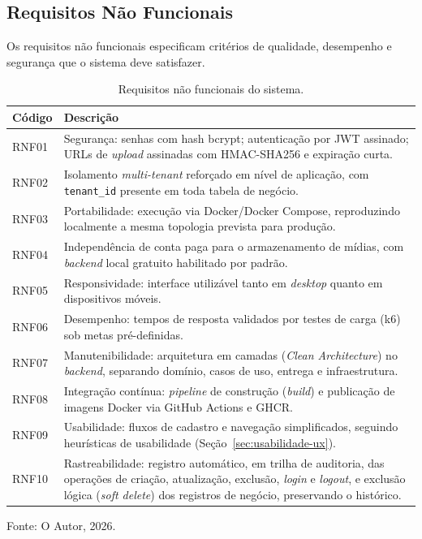 \subsection{Requisitos Não Funcionais}
\label{sec:requisitos-nao-funcionais}

Os requisitos não funcionais especificam critérios de qualidade, desempenho e segurança que o sistema deve satisfazer.

\begin{table}[H]
  \centering
  \caption{Requisitos não funcionais do sistema.}
  \label{tab:requisitos-nao-funcionais}
  \begin{tabular}{p{1.3cm}p{11.4cm}}
    \hline
    \textbf{Código} & \textbf{Descrição} \\
    \hline
    RNF01 & Segurança: senhas com hash bcrypt; autenticação por JWT assinado; URLs de \textit{upload} assinadas com HMAC-SHA256 e expiração curta. \\
    RNF02 & Isolamento \textit{multi-tenant} reforçado em nível de aplicação, com \texttt{tenant\_id} presente em toda tabela de negócio. \\
    RNF03 & Portabilidade: execução via Docker/Docker Compose, reproduzindo localmente a mesma topologia prevista para produção. \\
    RNF04 & Independência de conta paga para o armazenamento de mídias, com \textit{backend} local gratuito habilitado por padrão. \\
    RNF05 & Responsividade: interface utilizável tanto em \textit{desktop} quanto em dispositivos móveis. \\
    RNF06 & Desempenho: tempos de resposta validados por testes de carga (k6) sob metas pré-definidas. \\
    RNF07 & Manutenibilidade: arquitetura em camadas (\textit{Clean Architecture}) no \textit{backend}, separando domínio, casos de uso, entrega e infraestrutura. \\
    RNF08 & Integração contínua: \textit{pipeline} de construção (\textit{build}) e publicação de imagens Docker via GitHub Actions e GHCR. \\
    RNF09 & Usabilidade: fluxos de cadastro e navegação simplificados, seguindo heurísticas de usabilidade (Seção~\ref{sec:usabilidade-ux}). \\
    RNF10 & Rastreabilidade: registro automático, em trilha de auditoria, das operações de criação, atualização, exclusão, \textit{login} e \textit{logout}, e exclusão lógica (\textit{soft delete}) dos registros de negócio, preservando o histórico. \\
    \hline
  \end{tabular}
  \begin{minipage}{0.95\textwidth}
    \vspace{0.3em}
    {\small Fonte: O Autor, 2026.}
  \end{minipage}
\end{table}


